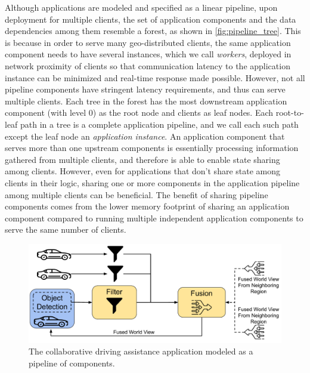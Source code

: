 Although applications are modeled and specified as a linear pipeline, upon deployment for multiple clients, the set of application components and the data dependencies among them resemble a forest, as shown in \cref{fig:pipeline_tree}. This is because in order to serve many geo-distributed clients, the same application component needs to have several instances, which we call \textit{workers}, deployed in network proximity of clients so that communication latency to the application instance can be minimized and real-time response made possible. However, not all pipeline components have stringent latency requirements, and thus can serve multiple clients. Each tree in the forest has the most downstream application component (with level 0) as the root node and clients as leaf nodes. Each root-to-leaf path in a tree is a complete application pipeline, and we call each such path except the leaf node an \textit{application instance}. An application component that serves more than one upstream components is essentially processing information gathered from multiple clients, and therefore is able to enable state sharing among clients. However, even for applications that don't share state among clients in their logic, sharing one or more components in the application pipeline among multiple clients can be beneficial. The benefit of sharing pipeline components comes from the lower memory footprint of sharing an application component compared to running multiple independent application components to serve the same number of clients.

\begin{figure}[ht]
\centering
\includegraphics[width=0.8\columnwidth]{figures/oneedge/collaborative_driving_app.pdf}
\caption{The collaborative driving assistance application modeled as a pipeline of components.}
\label{fig:collab_driving_pipeline}
\end{figure}

